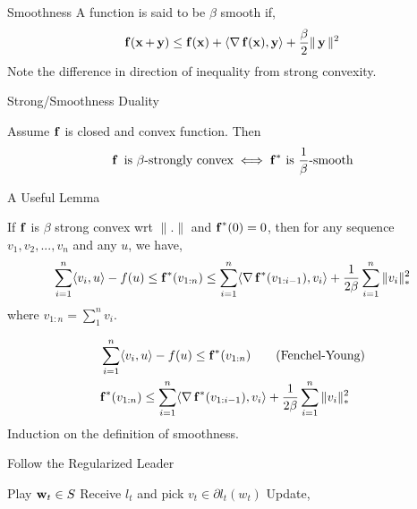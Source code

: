 \begin{frame}{Smoothness}
  A function is said to be $\beta$ smooth if,
  \begin{align*}
    \operatorname{\mathbf{f}}(\operatorname{\mathbf{x}}+\operatorname{\mathbf{y}}) \le \operatorname{\mathbf{f}}(\operatorname{\mathbf{x}}) + \langle {\operatorname{\nabla}\operatorname{\mathbf{f}}(\operatorname{\mathbf{x}})} , {\operatorname{\mathbf{y}}} \rangle +\frac{\beta}{2} \|\operatorname{\mathbf{y}}\|^2
  \end{align*}
  Note the difference in direction of inequality from strong convexity.
\end{frame}

\begin{frame}{Strong/Smoothness Duality}
  \begin{theorem}
    Assume $\operatorname{\mathbf{f}}$ is closed and convex function. Then
    \begin{align*}
      \operatorname{\mathbf{f}} \text{ is } \beta\text{-strongly convex} \iff {\operatorname{\mathbf{f}}}^{*} \text{ is } \frac{1}{\beta}\text{-smooth}
    \end{align*}
  \end{theorem}
\end{frame}

\begin{frame}{A Useful Lemma}
  \begin{lemma}
    If $\operatorname{\mathbf{f}}$ is $\beta$ strong convex wrt $\|.\|$ and ${\operatorname{\mathbf{f}}}^{*}(0)=0$, then for any sequence $v_1,v_2,...,v_n$ and any $u$, we have,
    \begin{align*}
      \sum_{i=1}^n \langle {v_i} , {u} \rangle - f(u) \le {\operatorname{\mathbf{f}}}^{*}(v_{1:n}) \le \sum_{i=1}^n \langle {\operatorname{\nabla}{\operatorname{\mathbf{f}}}^{*}(v_{1:i-1})} , {v_i} \rangle +\frac{1}{2\beta} \sum_{i=1}^n \|v_i\|_{*}^2
    \end{align*}
    where $v_{1:n}=\sum_1^n v_i$.
  \end{lemma}
\end{frame}

\begin{frame}
    \begin{align*}
      & \sum_{i=1}^n \langle {v_i} , {u} \rangle - f(u) \le {\operatorname{\mathbf{f}}}^{*}(v_{1:n}) \tag{Fenchel-Young} \\
      & {\operatorname{\mathbf{f}}}^{*}(v_{1:n}) \le \sum_{i=1}^n \langle {\operatorname{\nabla}{\operatorname{\mathbf{f}}}^{*}(v_{1:i-1})} , {v_i} \rangle +\frac{1}{2\beta} \sum_{i=1}^n \|v_i\|_{*}^2
    \end{align*}
    Induction on the definition of smoothness.
\end{frame}

\begin{frame}{Follow the Regularized Leader}
  \begin{algorithmic}
    \State Play $\operatorname{\mathbf{w}}_t \in S$
    \State Receive $l_t$ and pick $v_t \in \partial l_t(w_t)$
    \State Update,
    \EndFor
  \end{algorithmic}
\end{frame}

